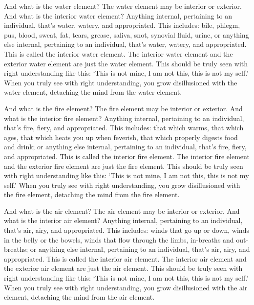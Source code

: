 \documentclass[12pt,openany]{book}%
\begin{document}
And what is the water element? The water element may be interior or exterior. And what is the interior water element? Anything internal, pertaining to an individual, that’s water, watery, and appropriated. This includes: bile, phlegm, pus, blood, sweat, fat, tears, grease, saliva, snot, synovial fluid, urine, or anything else internal, pertaining to an individual, that’s water, watery, and appropriated. This is called the interior water element. The interior water element and the exterior water element are just the water element. This should be truly seen with right understanding like this: ‘This is not mine, I am not this, this is not my self.’ When you truly see with right understanding, you grow disillusioned with the water element, detaching the mind from the water element. 

And what is the fire element? The fire element may be interior or exterior. And what is the interior fire element? Anything internal, pertaining to an individual, that’s fire, fiery, and appropriated. This includes: that which warms, that which ages, that which heats you up when feverish, that which properly digests food and drink; or anything else internal, pertaining to an individual, that’s fire, fiery, and appropriated. This is called the interior fire element. The interior fire element and the exterior fire element are just the fire element. This should be truly seen with right understanding like this: ‘This is not mine, I am not this, this is not my self.’ When you truly see with right understanding, you grow disillusioned with the fire element, detaching the mind from the fire element. 

And what is the air element? The air element may be interior or exterior. And what is the interior air element? Anything internal, pertaining to an individual, that’s air, airy, and appropriated. This includes: winds that go up or down, winds in the belly or the bowels, winds that flow through the limbs, in-breaths and out-breaths; or anything else internal, pertaining to an individual, that’s air, airy, and appropriated. This is called the interior air element. The interior air element and the exterior air element are just the air element. This should be truly seen with right understanding like this: ‘This is not mine, I am not this, this is not my self.’ When you truly see with right understanding, you grow disillusioned with the air element, detaching the mind from the air element. 
\end{document}
